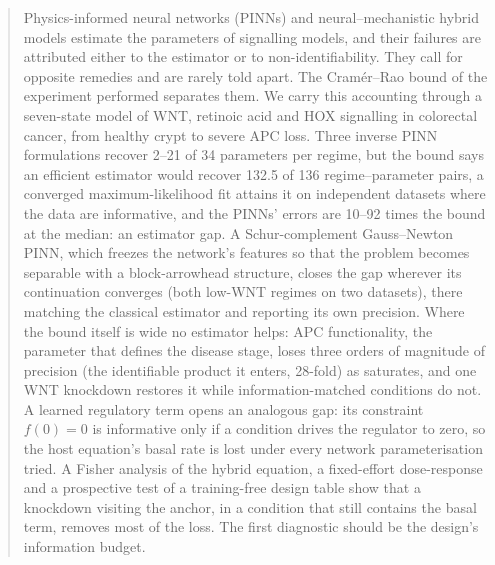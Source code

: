 \begin{abstract}
\noindent
Physics-informed neural networks (PINNs) and neural--mechanistic hybrid models
estimate the parameters of signalling models, and their failures are
attributed either to the estimator or to non-identifiability.
They call for opposite remedies and are rarely told apart. The Cram\'er--Rao bound of the experiment performed separates
them. We carry this accounting through a
seven-state model of WNT, retinoic acid and HOX signalling in colorectal cancer,
from healthy crypt to severe APC loss. Three inverse PINN formulations recover 2--21 of 34
parameters per regime, but the bound says an efficient estimator would recover
132.5 of 136 regime--parameter pairs, a converged maximum-likelihood fit
attains it on independent datasets where the data are informative, and the PINNs' errors are 10--92
times the bound at the median: an estimator gap. A Schur-complement
Gauss--Newton PINN, which freezes the network's features so that the problem
becomes separable with a block-arrowhead structure, closes the gap wherever its
continuation converges (both low-WNT regimes on two datasets), there matching
the classical estimator and reporting its own precision. Where the bound itself
is wide no estimator helps: APC functionality, the parameter that defines the
disease stage, loses three orders of magnitude of precision (the identifiable
product it enters, 28-fold) as \bcat{} saturates, and one WNT knockdown restores it while information-matched
conditions do not. A learned regulatory term opens an analogous gap: its
constraint $f(0)=0$ is informative only if a condition drives the regulator to
zero, so the host equation's basal rate is lost under every network
parameterisation tried. A Fisher analysis of the hybrid equation, a
fixed-effort dose-response and a prospective test of a training-free design
table show that a knockdown visiting the anchor, in a condition that still
contains the basal term, removes most of the loss. The first diagnostic should be the design's information budget.
\end{abstract}

